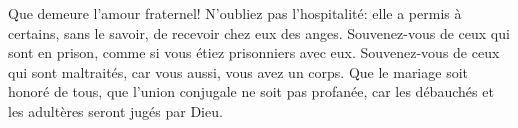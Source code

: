Que demeure l’amour fraternel!
N’oubliez pas l’hospitalité:
	elle a permis à certains, sans le savoir, de recevoir chez eux des anges.
Souvenez-vous de ceux qui sont en prison, comme si vous étiez prisonniers avec eux.
	Souvenez-vous de ceux qui sont maltraités, car vous aussi, vous avez un corps.
Que le mariage soit honoré de tous, que l’union conjugale ne soit pas profanée,
	car les débauchés et les adultères seront jugés par Dieu.
